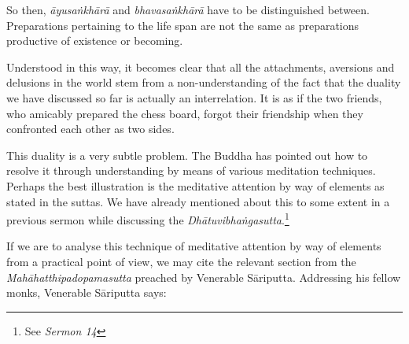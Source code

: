 So then, \emph{āyusaṅkhārā} and \emph{bhavasaṅkhārā} have to be distinguished between. Preparations pertaining to the life span are not the same as preparations productive of existence or becoming.

Understood in this way, it becomes clear that all the attachments, aversions and delusions in the world stem from a non-understanding of the fact that the duality we have discussed so far is actually an interrelation. It is as if the two friends, who amicably prepared the chess board, forgot their friendship when they confronted each other as two sides.

This duality is a very subtle problem. The Buddha has pointed out how to resolve it through understanding by means of various meditation techniques. Perhaps the best illustration is the meditative attention by way of elements as stated in the suttas. We have already mentioned about this to some extent in a previous sermon while discussing the \emph{Dhātuvibhaṅgasutta}.\footnote{See \emph{Sermon 14}}

\clearpage

If we are to analyse this technique of meditative attention by way of elements from a practical point of view, we may cite the relevant section from the \emph{Mahāhatthipadopamasutta} preached by Venerable Sāriputta. Addressing his fellow monks, Venerable Sāriputta says:

